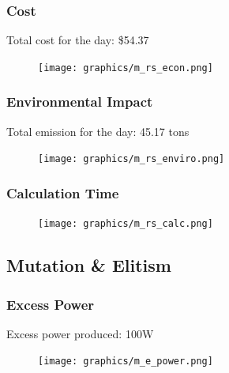 \documentclass{article}
\begin{document}
        \subsubsection{Cost}
        Total cost for the day: \$54.37
            \begin{figure}[h!]
                \begin{center}
                    \texttt{[image: graphics/m\_rs\_econ.png]}
                \end{center}                
                \label{fig:MRScost}
            \end{figure}
        \newpage    
        \subsubsection{Environmental Impact}
        Total emission for the day: 45.17 tons
            \begin{figure}[h!]
                \begin{center}
                    \texttt{[image: graphics/m\_rs\_enviro.png]}
                \end{center}                
                \label{fig:MRSemissions}
            \end{figure}
        
        \subsubsection{Calculation Time}
            \begin{figure}[h!]
                \begin{center}
                    \texttt{[image: graphics/m\_rs\_calc.png]}
                \end{center}                
                \label{fig:MRScalc}
            \end{figure}
    \newpage      
    \subsection{Mutation \& Elitism}
        \subsubsection{Excess Power}
        Excess power produced: 100W
            \begin{figure}[h!]
                \begin{center}
                    \texttt{[image: graphics/m\_e\_power.png]}
                \end{center}                
                \label{fig:MEpower}
            \end{figure}        
\end{document}
